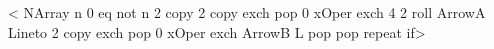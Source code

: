 \def\psLineToYAxis@ii{%
\addto@pscode{\pst@cp \psline@iii \tx@LineToYAxis}%
\end@OpenObj}
\def\tx@LineToYAxis{LineToYAxis }
<{
NArray
n 0 eq not
  { %
    n { 2 copy 2 copy exch pop 0 \ifPst@ScxBase xOper \fi exch 4 2 roll ArrowA Lineto
        2 copy exch pop 0 \ifPst@ScxBase xOper \fi exch ArrowB L pop pop
    } repeat
} if}>
%
%

